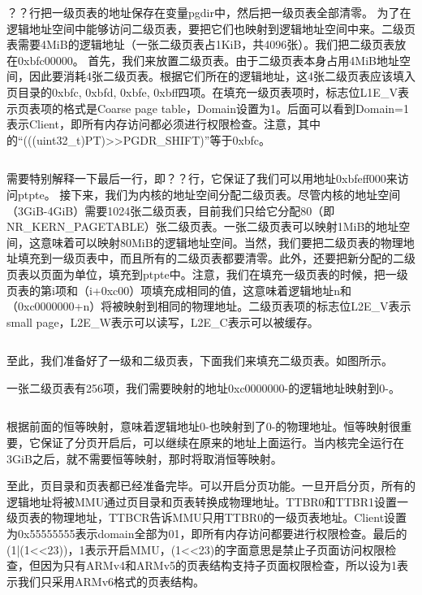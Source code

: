 \documentclass[main.tex]{subfiles}
\begin{document}
\begin{CJK*}{UTF8}{song}
？？行把一级页表的地址保存在变量pgdir中，然后把一级页表全部清零。
为了在逻辑地址空间中能够访问二级页表，要把它们也映射到逻辑地址空间中来。二级页表需要4MiB的逻辑地址（一张二级页表占1KiB，共4096张）。我们把二级页表放在0xbfc00000。
首先，我们来放置二级页表。由于二级页表本身占用4MiB地址空间，因此要消耗4张二级页表。根据它们所在的逻辑地址，这4张二级页表应该填入页目录的0xbfc, 0xbfd, 0xbfe, 0xbff四项。在填充一级页表项时，标志位L1E\_V表示页表项的格式是Coarse page table，Domain设置为1。后面可以看到Domain=1表示Client，即所有内存访问都必须进行权限检查。注意，其中的“(((uint32\_t)PT)>>PGDR\_SHIFT)”等于0xbfc。

\inputminted[firstline=149,lastline=159,linenos,numbersep=5pt,frame=lines,framesep=2mm]{c}{chapter04/kernel/machdep.c}

需要特别解释一下最后一行，即？？行，它保证了我们可以用地址0xbfeff000来访问ptpte。
接下来，我们为内核的地址空间分配二级页表。尽管内核的地址空间（3GiB-4GiB）需要1024张二级页表，目前我们只给它分配80（即NR\_KERN\_PAGETABLE）张二级页表。一张二级页表可以映射1MiB的地址空间，这意味着可以映射80MiB的逻辑地址空间。当然，我们要把二级页表的物理地址填充到一级页表中，而且所有的二级页表都要清零。此外，还要把新分配的二级页表以页面为单位，填充到ptpte中。注意，我们在填充一级页表的时候，把一级页表的第i项和（i+0xc00）项填充成相同的值，这意味着逻辑地址n和（0xc0000000+n）将被映射到相同的物理地址。二级页表项的标志位L2E\_V表示small page，L2E\_W表示可以读写，L2E\_C表示可以被缓存。

\inputminted[firstline=161,lastline=173,linenos,numbersep=5pt,frame=lines,framesep=2mm]{c}{chapter04/kernel/machdep.c}


至此，我们准备好了一级和二级页表，下面我们来填充二级页表。如图所示。

一张二级页表有256项，我们需要映射的地址0xc0000000-的逻辑地址映射到0-。

\inputminted[firstline=175,lastline=180,linenos,numbersep=5pt,frame=lines,framesep=2mm]{c}{chapter04/kernel/machdep.c}

根据前面的恒等映射，意味着逻辑地址0-也映射到了0-的物理地址。恒等映射很重要，它保证了分页开启后，可以继续在原来的地址上面运行。当内核完全运行在3GiB之后，就不需要恒等映射，那时将取消恒等映射。


至此，页目录和页表都已经准备完毕。可以开启分页功能。一旦开启分页，所有的逻辑地址将被MMU通过页目录和页表转换成物理地址。TTBR0和TTBR1设置一级页表的物理地址，TTBCR告诉MMU只用TTBR0的一级页表地址。Client设置为0x55555555表示domain全部为01，即所有内存访问都要进行权限检查。最后的 (1|(1<<23))，1表示开启MMU，(1<<23)的字面意思是禁止子页面访问权限检查，但因为只有ARMv4和ARMv5的页表结构支持子页面权限检查，所以设为1表示我们只采用ARMv6格式的页表结构。


\end{CJK*}
\end{document}
